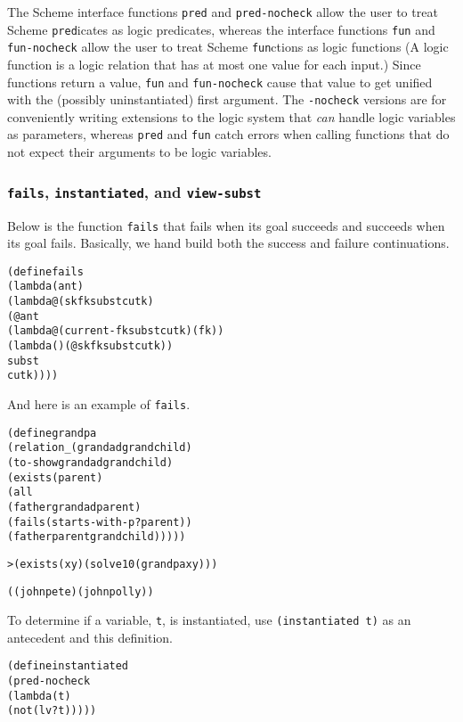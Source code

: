 The Scheme interface functions \texttt{pred} and \texttt{pred-nocheck}
allow the user to treat Scheme \texttt{pred}icates as logic predicates,
whereas the interface functions \texttt{fun} and \texttt{fun-nocheck} allow
the user to treat Scheme \texttt{fun}ctions as logic functions (A logic
function is a logic relation that has at most one value for each input.)
Since functions return a value, \texttt{fun} and \texttt{fun-nocheck} cause
that value to get unified with the (possibly uninstantiated) first
argument.  The \texttt{-nocheck} versions are for conveniently writing
extensions to the logic system that \emph{can} handle logic variables as
parameters, whereas \texttt{pred} and \texttt{fun} catch errors when
calling functions that do not expect their arguments to be logic variables.
\newpage
\subsubsection{\texttt{fails}, \texttt{instantiated}, and \texttt{view-subst}}

Below is the function \texttt{fails} that fails when its goal succeeds and
succeeds when its goal fails.  Basically, we hand build both the success
and failure continuations.

\begin{alltt}
(define fails
  (lambda (ant)
    (lambda@ (sk fk subst cutk)
      (@ ant
        (lambda@ (current-fk subst cutk) (fk))
        (lambda () (@ sk fk subst cutk))
        subst 
        cutk))))
\end{alltt}

\noindent
And here is an example of \texttt{fails}.

\begin{alltt}
(define grandpa
  (relation _ (grandad grandchild)
    (to-show grandad grandchild)
    (exists (parent)
      (all
        (father grandad parent)
        (fails (starts-with-p? parent))
        (father parent grandchild)))))
\end{alltt}

\begin{alltt}
> (exists (x y) (solve 10 (grandpa x y)))

((john pete) (john polly))
\end{alltt}

To determine if a variable, \texttt{t}, is instantiated, use
\texttt{(instantiated t)} as an antecedent and this definition.

\begin{alltt}
(define instantiated
  (pred-nocheck
    (lambda (t)
      (not (lv? t)))))
\end{alltt}

